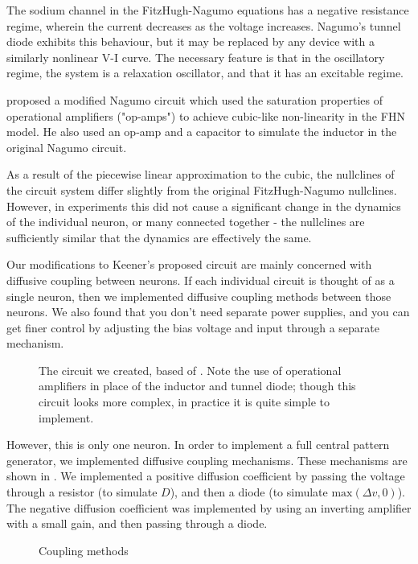 \documentclass[
    11pt,
]{article}
\begin{document}

The sodium channel in the FitzHugh-Nagumo equations has a negative resistance regime, wherein the current decreases as the voltage increases.  Nagumo's tunnel diode exhibits this behaviour, but it may be replaced by any device with a similarly nonlinear V-I curve.  The necessary feature is that in the oscillatory regime, the system is a relaxation oscillator, and that it has an excitable regime.

\citet{keener1983} proposed a modified Nagumo circuit which used the saturation properties of operational amplifiers ("op-amps") to achieve cubic-like non-linearity in the FHN model. He also used an op-amp and a capacitor to simulate the inductor in the original Nagumo circuit.

As a result of the piecewise linear approximation to the cubic, the nullclines of the circuit system differ slightly from the original FitzHugh-Nagumo nullclines.  However, in experiments this did not cause a significant change in the dynamics of the individual neuron, or many connected together - the nullclines are sufficiently similar that the dynamics are effectively the same.

Our modifications to Keener's proposed circuit are mainly concerned with diffusive coupling between neurons.  If each individual circuit is thought of as a single neuron, then we implemented diffusive coupling methods between those neurons.  We also found that you don't need separate power supplies, and you can get finer control by adjusting the bias voltage and input through a separate mechanism.

\begin{figure}[h!]
    \centering
    \caption{The circuit we created, based of \citet{keener1983}.  Note the use of operational amplifiers in place of the inductor and tunnel diode; though this circuit looks more complex, in practice it is quite simple to implement.}
    \label{fig: neuron_unit}
\end{figure}

However, this is only one neuron.  In order to implement a full central pattern generator, we implemented diffusive coupling mechanisms.  These mechanisms are shown in .  We implemented a positive diffusion coefficient by passing the voltage through a resistor (to simulate $D$), and then a diode (to simulate $\mathrm{max}(\Delta v, 0)$).  The negative diffusion coefficient was implemented by using an inverting amplifier with a small gain, and then passing through a diode.
\newsavebox{\tempbox}
\begin{figure}
    \centering
    \caption{Coupling methods}
    \label{fig: coupling}
\end{figure}
\end{document}
